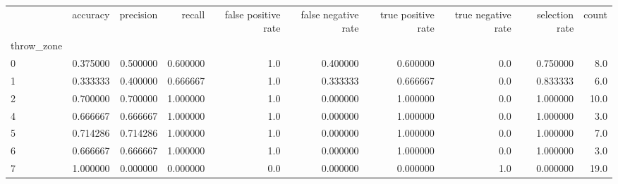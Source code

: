 \begin{tabular}{lrrrrrrrrr}
\toprule
{} &  accuracy &  precision &    recall &  false positive rate &  false negative rate &  true positive rate &  true negative rate &  selection rate &  count \\
throw\_zone &           &            &           &                      &                      &                     &                     &                 &        \\
\midrule
0          &  0.375000 &   0.500000 &  0.600000 &                  1.0 &             0.400000 &            0.600000 &                 0.0 &        0.750000 &    8.0 \\
1          &  0.333333 &   0.400000 &  0.666667 &                  1.0 &             0.333333 &            0.666667 &                 0.0 &        0.833333 &    6.0 \\
2          &  0.700000 &   0.700000 &  1.000000 &                  1.0 &             0.000000 &            1.000000 &                 0.0 &        1.000000 &   10.0 \\
4          &  0.666667 &   0.666667 &  1.000000 &                  1.0 &             0.000000 &            1.000000 &                 0.0 &        1.000000 &    3.0 \\
5          &  0.714286 &   0.714286 &  1.000000 &                  1.0 &             0.000000 &            1.000000 &                 0.0 &        1.000000 &    7.0 \\
6          &  0.666667 &   0.666667 &  1.000000 &                  1.0 &             0.000000 &            1.000000 &                 0.0 &        1.000000 &    3.0 \\
7          &  1.000000 &   0.000000 &  0.000000 &                  0.0 &             0.000000 &            0.000000 &                 1.0 &        0.000000 &   19.0 \\
\bottomrule
\end{tabular}
